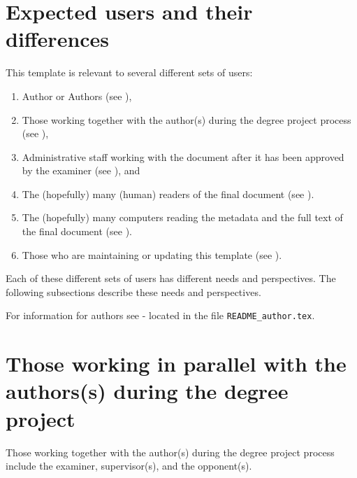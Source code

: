 \section{Expected users and their differences}
\label{sec:expectedUsers}
This template is relevant to several different sets of users:
\begin{enumerate}[leftmargin=*,label=\textbf{Users \arabic*}, ref={Users \arabic*}]
    \item \label{users:authors} Author or Authors (see ),
    \item \label{users:others} Those working together with the author(s) during the degree project process (see ),
    \item \label{users:admins} Administrative staff working with the document after it has been approved by the examiner (see ), and
    \item \label{users:readers} The (hopefully) many (human) readers of the final document (see ).
    \item \label{users:searchEngines} The (hopefully) many computers reading the metadata and the full text of the final document (see ).
    \item \label{users:maintainer} Those who are maintaining or updating this template (see ).
\end{enumerate}

Each of these different sets of users has different needs and perspectives. The following subsections describe these needs and perspectives.

For information for authors see  - located in the file \texttt{README\_author.tex}.

\section{Those working in parallel with the authors(s) during the degree project}
\label{sec:examinerAdvisorsOpponent}
Those working together with the author(s) during the degree project process include the examiner, supervisor(s), and the opponent(s).

